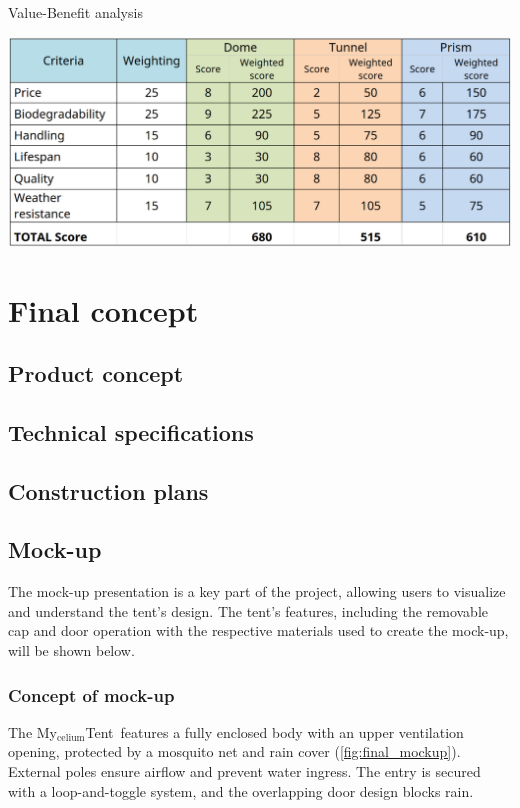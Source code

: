 \documentclass{article}
\newcommand{\myc}{My$_{\text{celium}}$Tent}
\begin{document}
\begin{table}[ht!]
    \centering
    \caption{Value-Benefit analysis}
    \includegraphics[width=.75\textwidth]{media/val-ben.png}
    \label{tab:val-ben}
\end{table}

\section{Final concept}

\subsection{Product concept}

\subsection{Technical specifications}

\subsection{Construction plans}

\subsection{Mock-up}
The mock-up presentation is a key part of the project, allowing users to visualize and
understand the tent's design. The tent's features, including the removable cap and door
operation with the respective materials used to create the mock-up, will be shown below.

\subsubsection{Concept of mock-up}
The \myc\ features a fully enclosed body with an upper ventilation opening, protected by a
mosquito net and rain cover (\autoref{fig:final_mockup}).\\
External poles ensure airflow and prevent water ingress. The entry is secured with a
loop-and-toggle system, and the overlapping door design blocks rain.
\end{document}
